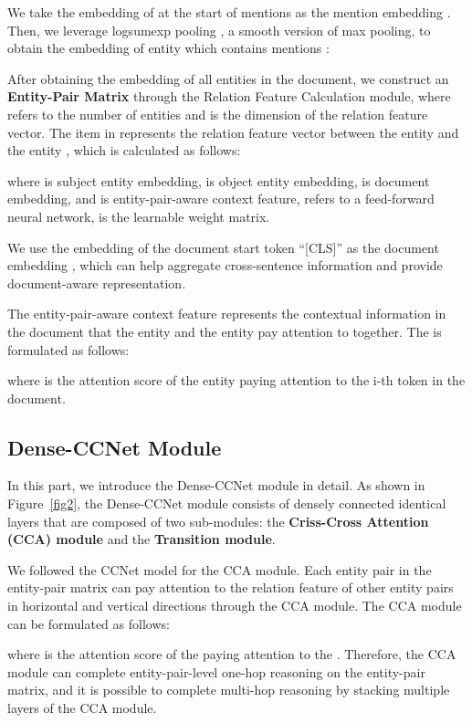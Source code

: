 \documentclass[11pt]{article}
\begin{document}
We take the embedding of  at the start of mentions  as the mention embedding . Then, we leverage logsumexp pooling \cite{c:120}, a smooth version of max pooling, to obtain the embedding  of entity  which contains  mentions :


After obtaining the embedding of all entities in the document, we construct an \textbf{Entity-Pair Matrix}  through the Relation Feature Calculation module, where  refers to the number of entities and  is the dimension of the relation feature vector. 
The  item in  represents the relation feature vector between the entity  and the entity , which is calculated as follows:

where  is subject entity embedding,  is object entity embedding,  is document embedding, and  is entity-pair-aware context feature,  refers to a feed-forward neural network,  is the learnable weight matrix.


We use the embedding of the document start token “[CLS]” as the document embedding , which can help aggregate cross-sentence information and provide document-aware representation.

The entity-pair-aware context feature  represents the contextual information in the document that the entity  and the entity  pay attention to together. 
The  is formulated as follows:

where  is the attention score of the entity  paying attention to the i-th token  in the document.





\subsection{Dense-CCNet Module}
\label{sec2.2}
In this part, we introduce the Dense-CCNet module in detail.
As shown in Figure~\ref{fig2}, the Dense-CCNet module consists of densely connected  identical layers that are composed of two sub-modules: the \textbf{Criss-Cross Attention (CCA) module} and the \textbf{Transition module}.

We followed the CCNet model \cite{c:116} for the CCA module.
Each entity pair in the entity-pair matrix can pay attention to the relation feature of other entity pairs in horizontal and vertical directions through the CCA module.
The CCA module can be formulated as follows:

where  is the attention score of the  paying attention to the .
Therefore, the CCA module can complete entity-pair-level one-hop reasoning on the entity-pair matrix, and it is possible to complete multi-hop reasoning by stacking multiple layers of the CCA module.
\end{document}
